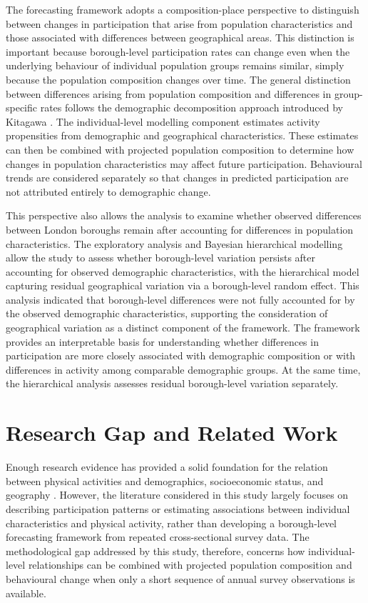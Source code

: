 \documentclass[ %
                    author={Ashrey Ashrey, Sanya Kapoor, Trisha Sharma, Yash Bhooshan Pandloskar},
                supervisor={Dr. Dalila O’Grady},
                    degree={MSc},
                     title={Using machine learning to forecast physical activity participation, volunteering and activity patterns in London},
                  subtitle={},
                      type={},
                      year={2021}]{dissertation}
\begin{document}
The forecasting framework adopts a composition-place perspective to distinguish between changes in participation that arise from population characteristics and those associated with differences between geographical areas. This distinction is important because borough-level participation rates can change even when the underlying behaviour of individual population groups remains similar, simply because the population composition changes over time. The general distinction between differences arising from population composition and differences in group-specific rates follows the demographic decomposition approach introduced by Kitagawa \cite{kitagawa_1955}. The individual-level modelling component estimates activity propensities from demographic and geographical characteristics. These estimates can then be combined with projected population composition to determine how changes in population characteristics may affect future participation. Behavioural trends are considered separately so that changes in predicted participation are not attributed entirely to demographic change.

This perspective also allows the analysis to examine whether observed differences between London boroughs remain after accounting for differences in population characteristics. The exploratory analysis and Bayesian hierarchical modelling allow the study to assess whether borough-level variation persists after accounting for observed demographic characteristics, with the hierarchical model capturing residual geographical variation via a borough-level random effect. This analysis indicated that borough-level differences were not fully accounted for by the observed demographic characteristics, supporting the consideration of geographical variation as a distinct component of the framework. The framework provides an interpretable basis for understanding whether differences in participation are more closely associated with demographic composition or with differences in activity among comparable demographic groups. At the same time, the hierarchical analysis assesses residual borough-level variation separately.

\section{Research Gap and Related Work}

Enough research evidence has provided a solid foundation for the relation between physical activities and demographics, socioeconomic status, and geography \cite{davis_etal_2011,brainard_etal_2019,brinkley_etal_2024}. However, the literature considered in this study largely focuses on describing participation patterns or estimating associations between individual characteristics and physical activity, rather than developing a borough-level forecasting framework from repeated cross-sectional survey data. The methodological gap addressed by this study, therefore, concerns how individual-level relationships can be combined with projected population composition and behavioural change when only a short sequence of annual survey observations is available.
\end{document}
